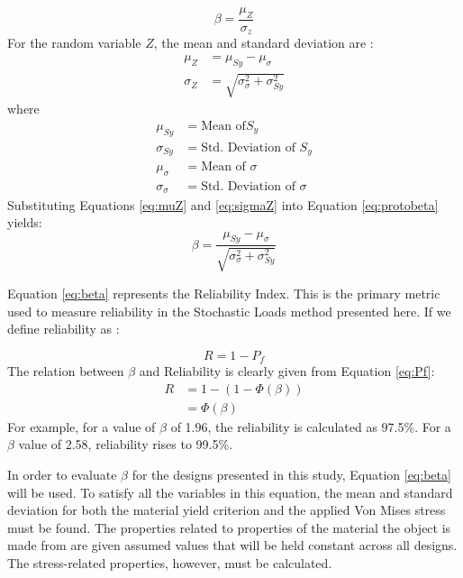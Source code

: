 \begin{equation}
\beta = \frac{\mu_Z}{\sigma_z}\label{eq:protobeta}
\end{equation}
For the random variable $Z$, the mean and standard deviation are \cite{risk2}:
\begin{align}
\mu_Z &= \mu_{Sy} - \mu_\sigma\label{eq:muZ}\\
\sigma_Z &= \sqrt{\sigma_{\sigma}^2 + \sigma_{Sy}^2}\label{eq:sigmaZ}
\end{align}
where
   \begin{align*}
	   \mu_{Sy} &= \text{Mean of} S_y\\
	   \sigma_{Sy} &= \text{Std. Deviation of }S_y\\
	   \mu_{\sigma} &= \text{Mean of }\sigma\\
	   \sigma_{\sigma} &= \text{Std. Deviation of }\sigma
   \end{align*}
Substituting Equations \ref{eq:muZ} and \ref{eq:sigmaZ} into Equation \ref{eq:protobeta} yields:
   \begin{equation}
	   \beta = \frac{\mu_{Sy} - \mu_\sigma}{\sqrt{\sigma_{\sigma}^2 + \sigma_{Sy}^2}}
	   \label{eq:beta}
   \end{equation}

Equation \ref{eq:beta} represents the Reliability Index. This is the primary metric used to measure reliability in the Stochastic Loads method presented here. If we define reliability as \cite{risk2}: 

\begin{equation}
R = 1 - P_f
\end{equation}
The relation between $\beta$ and Reliability is clearly given from Equation \ref{eq:Pf}:
\begin{align}
R &= 1 - \left(1 - \Phi (\beta)\right)\nonumber\\
&= \Phi(\beta)
\end{align}
For example, for a value of $\beta$ of 1.96, the reliability is calculated as 97.5\%. For a $\beta$ value of 2.58, reliability rises to 99.5\%. 

In order to evaluate $\beta$ for the designs presented in this study, Equation \ref{eq:beta} will be used. To satisfy all the variables in this equation, the mean and standard deviation for both the material yield criterion and the applied Von Mises stress must be found. The properties related to properties of the material the object is made from are given assumed values that will be held constant across all designs. The stress-related properties, however, must be calculated.

